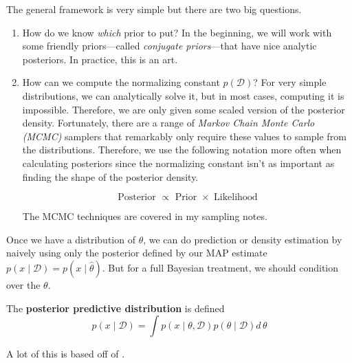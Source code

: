 The general framework is very simple but there are two big questions. 
\begin{enumerate}
  \item How do we know \textit{which} prior to put? In the beginning, we will work with some friendly priors---called \textit{conjugate priors}---that have nice analytic posteriors. In practice, this is an art. 

  \item How can we compute the normalizing constant $p(\mathcal{D})$? For very simple distributions, we can analytically solve it, but in most cases, computing it is impossible. Therefore, we are only given some scaled version of the posterior density. Fortunately, there are a range of \textit{Markov Chain Monte Carlo (MCMC)} samplers that remarkably only require these values to sample from the distributions. Therefore, we use the following notation more often when calculating posteriors since the normalizing constant isn't as important as finding the shape of the posterior density.

  \begin{equation}
    \text{Posterior } \propto \text{ Prior } \times \text{ Likelihood}
  \end{equation}

  The MCMC techniques are covered in my sampling notes. 
\end{enumerate}

Once we have a distribution of $\theta$, we can do prediction or density estimation by naively using only the posterior defined by our MAP estimate $p(x \mid \mathcal{D}) = p(x \mid \hat{\theta})$. But for a full Bayesian treatment, we should condition over the $\theta$. 

\begin{definition}
  The \textbf{posterior predictive distribution} is defined 
  \begin{equation}
    p(x \mid \mathcal{D}) = \int p(x \mid \theta, \mathcal{D}) p(\theta \mid \mathcal{D}) d\, \theta
  \end{equation}
\end{definition}

A lot of this is based off of \cite{2009hoff}. 

